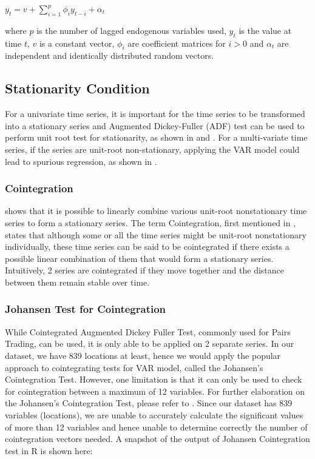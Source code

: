 \documentclass[12pt, letterpaper] {article}
\begin{document}
\begin{center}
    $\displaystyle y_t=v+\sum_{i=1}^{p} \phi_{i}y_{t-i}+\alpha_t$
\end{center}

\noindent where $p$ is the number of lagged endogenous variables used, $y_t$ is the value at time $t$, $v$ is a constant vector, $\phi_i$ are coefficient matrices for $i>0$ and $\alpha_t$ are independent and identically distributed random vectors. 

\subsection{Stationarity Condition}
For a univariate time series, it is important for the time series to be transformed into a stationary series and Augmented Dickey-Fuller (ADF) test can be used to perform unit root test for stationarity, as shown in \cite{Zhijie1998} and \cite{Rizwan2011}. For a multi-variate time series, if the series are unit-root non-stationary, applying the VAR model could lead to spurious regression, as shown in \cite{Baumohl2009}.  

\subsubsection{Cointegration}
\cite{Box1977} shows that it is possible to linearly combine various unit-root nonstationary time series to form a stationary series. The term Cointegration, first mentioned in \cite{Granger1983}, states that although some or all the time series might be unit-root nonstationary individually, these time series can be said to be cointegrated if there exists a possible linear combination of them that would form a stationary series. Intuitively, 2 series are cointegrated if they move together and the distance between them remain stable over time. 

\subsubsection{Johansen Test for Cointegration}
While Cointegrated Augmented Dickey Fuller Test, commonly used for Pairs Trading, can be used, it is only able to be applied on 2 separate series. In our dataset, we have 839 locations at least, hence we would apply the popular approach to cointegrating tests for VAR model, called the Johansen's Cointegration Test. However, one limitation is that it can only be used to check for cointegration between a maximum of 12 variables. For further elaboration on the Johansen's Cointegration Test, please refer to \cite{Johansen1991}. Since our dataset has 839 variables (locations), we are unable to accurately calculate the significant values of more than 12 variables and hence unable to determine correctly the number of cointegration vectors needed. A snapshot of the output of Johansen Cointegration test in R is shown here:
\end{document}
